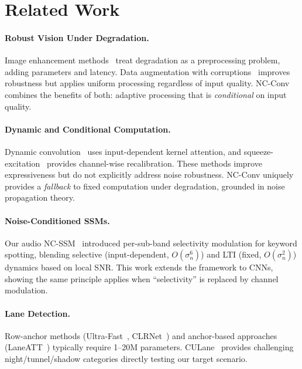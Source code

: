 \documentclass{bmvc2k}
\begin{document}
\section{Related Work}
\label{sec:related}

\paragraph{Robust Vision Under Degradation.}
Image enhancement methods~\cite{land1977retinex,guo2020zerodce,wei2018deepretinex,zamir2022restormer} treat degradation as a preprocessing problem, adding parameters and latency.
Data augmentation with corruptions~\cite{hendrycks2019benchmarking} improves robustness but applies uniform processing regardless of input quality.
NC-Conv combines the benefits of both: adaptive processing that is \emph{conditional} on input quality.

\paragraph{Dynamic and Conditional Computation.}
Dynamic convolution~\cite{chen2020dynamic} uses input-dependent kernel attention, and squeeze-excitation~\cite{hu2018squeeze} provides channel-wise recalibration.
These methods improve expressiveness but do not explicitly address noise robustness.
NC-Conv uniquely provides a \emph{fallback} to fixed computation under degradation, grounded in noise propagation theory.

\paragraph{Noise-Conditioned SSMs.}
Our audio NC-SSM~\cite{choi2026ncssm} introduced per-sub-band selectivity modulation for keyword spotting, blending selective (input-dependent, $O(\sigma_n^6)$) and LTI (fixed, $O(\sigma_n^2)$) dynamics based on local SNR.
This work extends the framework to CNNs, showing the same principle applies when ``selectivity'' is replaced by channel modulation.

\paragraph{Lane Detection.}
Row-anchor methods (Ultra-Fast~\cite{qin2020ultrafast}, CLRNet~\cite{zheng2022clrnet}) and anchor-based approaches (LaneATT~\cite{tabelini2021laneatt}) typically require 1--20M parameters.
CULane~\cite{pan2018culane} provides challenging night/tunnel/shadow categories directly testing our target scenario.
\end{document}
